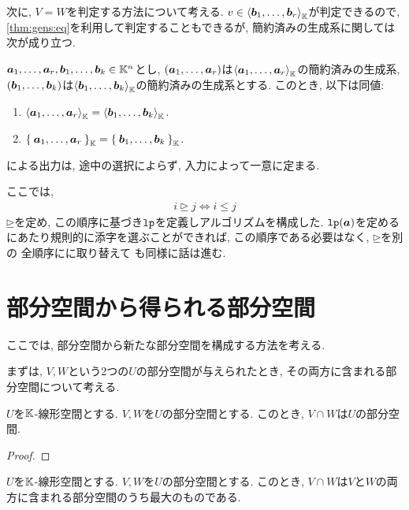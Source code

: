次に, 
$V=W$を判定する方法について考える.
$v\in \Braket{\boldsymbol{b}_1,\ldots,\boldsymbol{b}_r}_{\mathbb{K}}$が判定できるので,
\cref{thm:gens:eq}を利用して判定することもできるが,
簡約済みの生成系に関しては次が成り立つ.
\begin{theorem}
  $\boldsymbol{a}_1,\ldots,\boldsymbol{a}_r,\boldsymbol{b}_1,\ldots,\boldsymbol{b}_k\in \mathbb{K}^n$とし,
  $(\boldsymbol{a}_1,\ldots,\boldsymbol{a}_r)$は$\Braket{\boldsymbol{a}_1,\ldots,\boldsymbol{a}_r}_{\mathbb{K}}$の簡約済みの生成系,
  $(\boldsymbol{b}_1,\ldots,\boldsymbol{b}_k)$は$\Braket{\boldsymbol{b}_1,\ldots,\boldsymbol{b}_k}_{\mathbb{K}}$の簡約済みの生成系とする.
  このとき,
  以下は同値:
  \begin{enumerate}
  \item $\Braket{\boldsymbol{a}_1,\ldots,\boldsymbol{a}_r}_{\mathbb{K}}=\Braket{\boldsymbol{b}_1,\ldots,\boldsymbol{b}_k}_{\mathbb{K}}$.
  \item $\Set{\boldsymbol{a}_1,\ldots,\boldsymbol{a}_r}_{\mathbb{K}}=\Set{\boldsymbol{b}_1,\ldots,\boldsymbol{b}_k}_{\mathbb{K}}$.
  \end{enumerate}
\end{theorem}
\begin{cor}
  による出力は,
  途中の選択によらず, 入力によって一意に定まる.
\end{cor}

\begin{remark}
ここでは, 
\begin{align*}
i\unrhd j \iff i \leq j
\end{align*}
$\unrhd$を定め,
この順序に基づき$\operatorname{\texttt{lp}}$を定義しアルゴリズムを構成した.
$\operatorname{\texttt{lp}}(\boldsymbol{a})$を定めるにあたり規則的に添字を選ぶことができれば,
この順序である必要はなく,
$\unrhd$を別の
全順序にに取り替えて
も同様に話は進む.
\end{remark}
  


\section{部分空間から得られる部分空間}
\label{sec:subspace:sub}

ここでは, 部分空間から新たな部分空間を構成する方法を考える.

まずは, $V,W$という2つの$U$の部分空間が与えられたとき,
その両方に含まれる部分空間について考える.
\begin{example}
  $U$を$\mathbb{K}$-線形空間とする.
  $V, W$を$U$の部分空間とする.
  このとき, $V\cap W$は$U$の部分空間.
\end{example}
\begin{proof}\end{proof}
\begin{prop}
  $U$を$\mathbb{K}$-線形空間とする.
  $V, W$を$U$の部分空間とする.
  このとき, $V\cap W$は$V$と$W$の両方に含まれる部分空間のうち最大のものである.
\end{prop}

